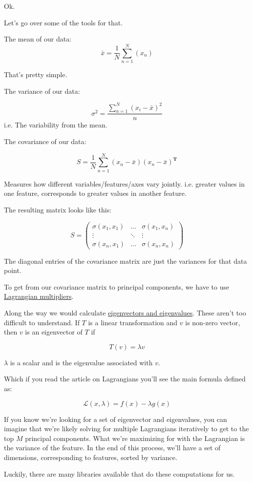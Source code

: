 \documentclass[letterpaper,12pt]{article}
\begin{document}
Ok.

Let's go over some of the tools for that.

The mean of our data:
\[
    \bar{x} = \frac{1}{N}\sum_{n=1}^{N}(x_n)
\]

That's pretty simple.

The variance of our data:

\[
    \sigma^2 = \frac{\sum_{n=1}^{N} (x_i - \bar{x})^2}{n}
\]
i.e. The variability from the mean.

The covariance of our data:

\[
    S = \frac{1}{N} \sum_{n=1}^{N} (x_n - \bar{x})(x_n - \bar{x})^{\textbf{T}}
\]

Measures how different variables/features/axes vary jointly. i.e. greater values
in one feature, corresponds to greater values in another feature.

The resulting matrix looks like this:

\[
S = \begin{pmatrix}
    \sigma(x_1, x_1) & \dots & \sigma(x_1, x_n)\\
    \vdots & \ddots & \vdots  \\
    \sigma(x_n, x_1)  & \dots & \sigma(x_n, x_n)
    \end{pmatrix}
\]

The diagonal entries of the covariance matrix are just the variances for that
data point.

To get from our covariance matrix to principal components, we have to use
\href{https://en.wikipedia.org/wiki/Lagrange_multiplier}{Lagrangian
multipliers}.

Along the way we would calculate \href{https://en.wikipedia.org/wiki/Eigenvalues_and_eigenvectors}{eigenvectors and eigenvalues}.
These aren't too difficult to understand. If $T$ is a linear transformation and
$v$ is non-zero vector, then $v$ is an eigenvector of $T$ if

\[
    T(v) = \lambda v
\]

$\lambda$ is a scalar and is the eigenvalue associated with $v$.

Which if you read the article on Lagrangians you'll see the main formula defined
as:

\[
    \mathcal{L}(x, \lambda) = f(x) - \lambda g(x)
\]

If you know we're looking for a set of eigenvector and eigenvalues, you can imagine
that we're likely solving for multiple Lagrangians iteratively to get to the top
$M$ principal components. What we're maximizing for with the Lagrangian is the
variance of the feature. In the end of this process, we'll have a set of
dimensions, corresponding to features, sorted by variance.

Luckily, there are many libraries available that do these computations for us.
\end{document}
